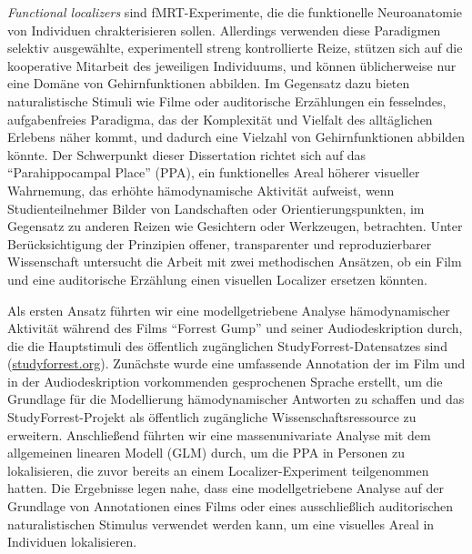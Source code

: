 \textit{Functional localizers} sind fMRT-Experimente, die die funktionelle
Neuroanatomie von Individuen chrakterisieren sollen.
Allerdings verwenden diese Paradigmen selektiv ausgewählte, experimentell
streng kontrollierte Reize, stützen sich auf die kooperative Mitarbeit des
jeweiligen Individuums, und können üblicherweise nur eine Domäne von
Gehirnfunktionen abbilden.
%
Im Gegensatz dazu bieten naturalistische Stimuli wie Filme oder auditorische
Erzählungen ein fesselndes, aufgabenfreies Paradigma, das der Komplexität und
Vielfalt des alltäglichen Erlebens näher kommt, und dadurch eine Vielzahl von
Gehirnfunktionen abbilden könnte.
Der Schwerpunkt dieser Dissertation richtet sich auf das ``Parahippocampal
Place'' (PPA), ein funktionelles Areal höherer visueller Wahrnemung, das
erhöhte hämodynamische Aktivität aufweist, wenn Studienteilnehmer Bilder von
Landschaften oder Orientierungspunkten, im Gegensatz zu anderen Reizen wie
Gesichtern oder Werkzeugen, betrachten.
%
Unter Berücksichtigung der Prinzipien offener, transparenter und
reproduzierbarer Wissenschaft untersucht die Arbeit mit zwei methodischen
Ansätzen, ob ein Film und eine auditorische Erzählung einen visuellen Localizer
ersetzen könnten.

Als ersten Ansatz führten wir eine modellgetriebene Analyse hämodynamischer
Aktivität während des Films ``Forrest Gump'' und seiner Audiodeskription durch,
die die Hauptstimuli des öffentlich zugänglichen StudyForrest-Datensatzes sind
(\href{www.studyforrest.org}{\url{studyforrest.org}}).
%
Zunächste wurde eine umfassende Annotation der im Film und in der
Audiodeskription vorkommenden gesprochenen Sprache erstellt, um die Grundlage
für die Modellierung hämodynamischer Antworten zu schaffen und das
StudyForrest-Projekt als öffentlich zugängliche Wissenschaftsressource zu
erweitern.
%
Anschließend führten wir eine massenunivariate Analyse mit dem allgemeinen
linearen Modell (GLM) durch, um die PPA in Personen zu lokalisieren, die zuvor
bereits an einem Localizer-Experiment teilgenommen hatten.
Die Ergebnisse legen nahe, dass eine modellgetriebene Analyse auf der Grundlage
von Annotationen eines Films oder eines ausschließlich auditorischen
naturalistischen Stimulus verwendet werden kann, um eine visuelles Areal in
Individuen lokalisieren.


